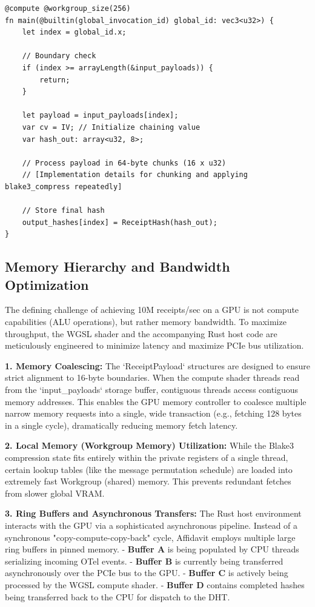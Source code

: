 \begin{verbatim}
@compute @workgroup_size(256)
fn main(@builtin(global_invocation_id) global_id: vec3<u32>) {
    let index = global_id.x;
    
    // Boundary check
    if (index >= arrayLength(&input_payloads)) {
        return;
    }

    let payload = input_payloads[index];
    var cv = IV; // Initialize chaining value
    var hash_out: array<u32, 8>;
    
    // Process payload in 64-byte chunks (16 x u32)
    // [Implementation details for chunking and applying blake3_compress repeatedly]
    
    // Store final hash
    output_hashes[index] = ReceiptHash(hash_out);
}
\end{verbatim}

\subsection{Memory Hierarchy and Bandwidth Optimization}

The defining challenge of achieving 10M receipts/sec on a GPU is not compute capabilities (ALU operations), but rather memory bandwidth. To maximize throughput, the WGSL shader and the accompanying Rust host code are meticulously engineered to minimize latency and maximize PCIe bus utilization.

\textbf{1. Memory Coalescing:} The `ReceiptPayload` structures are designed to ensure strict alignment to 16-byte boundaries. When the compute shader threads read from the `input_payloads` storage buffer, contiguous threads access contiguous memory addresses. This enables the GPU memory controller to coalesce multiple narrow memory requests into a single, wide transaction (e.g., fetching 128 bytes in a single cycle), dramatically reducing memory fetch latency.

\textbf{2. Local Memory (Workgroup Memory) Utilization:} While the Blake3 compression state fits entirely within the private registers of a single thread, certain lookup tables (like the message permutation schedule) are loaded into extremely fast Workgroup (shared) memory. This prevents redundant fetches from slower global VRAM.

\textbf{3. Ring Buffers and Asynchronous Transfers:} The Rust host environment interacts with the GPU via a sophisticated asynchronous pipeline. Instead of a synchronous "copy-compute-copy-back" cycle, Affidavit employs multiple large ring buffers in pinned memory.
- \textbf{Buffer A} is being populated by CPU threads serializing incoming OTel events.
- \textbf{Buffer B} is currently being transferred asynchronously over the PCIe bus to the GPU.
- \textbf{Buffer C} is actively being processed by the WGSL compute shader.
- \textbf{Buffer D} contains completed hashes being transferred back to the CPU for dispatch to the DHT.

